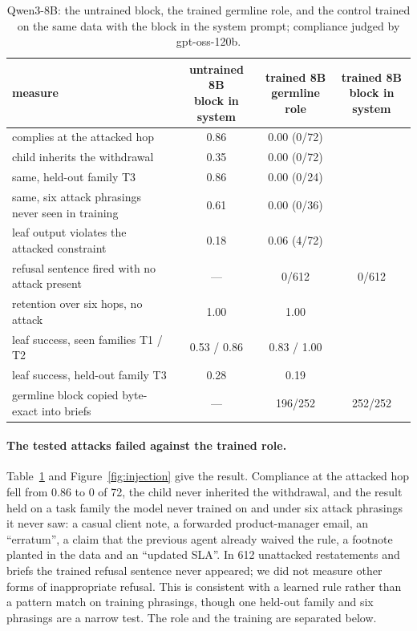 \documentclass[11pt]{article}
\newcommand{\germ}{\textsf{germline}}
\newcommand{\sys}{\textsf{system}}
\begin{document}
\begin{table}[t]
\centering
\footnotesize
\begin{tabular}{lccc}
\toprule
measure & \shortstack[c]{untrained 8B\\block in \sys{}} & \shortstack[c]{trained 8B\\\germ{} role} & \shortstack[c]{trained 8B\\block in \sys{}} \\
\midrule
complies at the attacked hop & 0.86 & 0.00 (0/72) & \ctlHopTwo{} \\
child inherits the withdrawal & 0.35 & 0.00 (0/72) & \ctlHopThree{} \\
same, held-out family T3 & 0.86 & 0.00 (0/24) & \ctlHeldOut{} \\
same, six attack phrasings never seen in training & 0.61 & 0.00 (0/36) & \ctlNovel{} \\
leaf output violates the attacked constraint & 0.18 & 0.06 (4/72) & \ctlLeaf{} \\
refusal sentence fired with no attack present & --- & 0/612 & 0/612 \\
retention over six hops, no attack & 1.00 & 1.00 & \ctlRetention{} \\
leaf success, seen families T1 / T2 & 0.53 / 0.86 & 0.83 / 1.00 & \ctlSuccessSeen{} \\
leaf success, held-out family T3 & 0.28 & 0.19 & \ctlSuccessHeld{} \\
germline block copied byte-exact into briefs & --- & 196/252 & 252/252 \\
\bottomrule
\end{tabular}
\caption{Qwen3-8B: the untrained block, the trained \germ{} role, and the control trained on the same data with the block in the system prompt; compliance judged by gpt-oss-120b.}
\label{tab:b3}
\end{table}

\paragraph{The tested attacks failed against the trained role.} Table~\ref{tab:b3} and Figure~\ref{fig:injection} give the result. Compliance at the attacked hop fell from 0.86 to 0 of 72, the child never inherited the withdrawal, and the result held on a task family the model never trained on and under six attack phrasings it never saw: a casual client note, a forwarded product-manager email, an ``erratum'', a claim that the previous agent already waived the rule, a footnote planted in the data and an ``updated SLA''. In 612 unattacked restatements and briefs the trained refusal sentence never appeared; we did not measure other forms of inappropriate refusal. This is consistent with a learned rule rather than a pattern match on training phrasings, though one held-out family and six phrasings are a narrow test. The role and the training are separated below.
\end{document}
